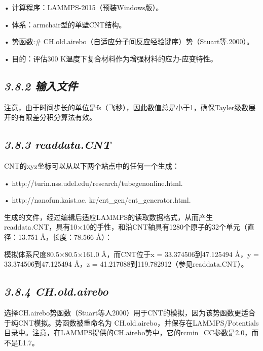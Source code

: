 • 计算程序：LAMMPS-2015（预装Windows版）。

• 体系：armchair型的单壁CNT结构。

• 势函数:\#
CH.old.airebo（自适应分子间反应经验键序）势（Stuart等.2000）。

• 目的：评估300 K温度下复合材料作为增强材料的应力-应变特性。

\hypertarget{ux8f93ux5165ux6587ux4ef6-6}{%
\subsection{\texorpdfstring{\emph{3.8.2
输入文件}}{3.8.2 输入文件}}\label{ux8f93ux5165ux6587ux4ef6-6}}



注意，由于时间步长的单位是fs（飞秒），因此数值总是小于1，确保Tayler级数展开的有限差分积分算法有效。

\hypertarget{readdata.cnt}{%
\subsection{\texorpdfstring{\emph{3.8.3
readdata.CNT}}{3.8.3 readdata.CNT}}\label{readdata.cnt}}

CNT的xyz坐标可以从以下两个站点中的任何一个生成：

• http://turin.nss.udel.edu/research/tubegenonline.html.

• http://nanofun.kaist.ac. kr/cnt\_gen/cnt\_generator.html.

生成的文件，经过编辑后适应LAMMPS的读取数据格式，从而产生readdata.CNT，具有10×10的手性，和沿CNT轴具有1280个原子的32个单元（直径：13.751
Å，长度：78.566 Å）：


模拟体系尺度80.5×80.5×161.0 Å，而CNT位于x = 33.374506到47.125494 Å，y =
33.374506到47.125494 Å，z = 41.217088到119.782912（参见readdata.CNT）。

\hypertarget{ch.old.airebo}{%
\subsection{\texorpdfstring{\emph{3.8.4
CH.old.airebo}}{3.8.4 CH.old.airebo}}\label{ch.old.airebo}}

选择CH.airebo势函数（Stuart等人2000）用于CNT的模拟，因为该势函数更适合于纯CNT模拟。势函数被重命名为
CH.old.airebo，并保存在LAMMPS/Potentials目录中。注意，在LAMMPS提供的CH.airebo势中，它的rcmin\_CC参数是2.0，而不是L1.7。

